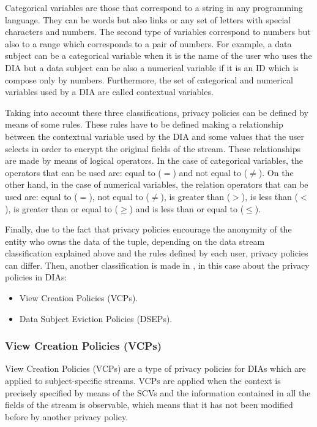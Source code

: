 Categorical variables are those that correspond to a string in any programming language. They can be words but also links or any set of letters with special characters and numbers. The second type of variables correspond to numbers but also to a range which corresponds to a pair of numbers. For example, a data subject can be a categorical variable when it is the name of the user who uses the DIA but a data subject can be also a numerical variable if it is an ID which is compose only by numbers. Furthermore, the set of categorical and numerical variables used by a DIA are called contextual variables.

Taking into account these three classifications, privacy policies can be defined by means of some rules. These rules have to be defined making a relationship between the contextual variable used by the DIA and some values that the user selects in order to encrypt the original fields of the stream. These relationships are made by means of logical operators. In the case of categorical variables, the operators that can be used are: equal to ($=$) and not equal to ($\neq$). On the other hand, in the case of numerical variables, the relation operators that can be used are: equal to ($=$), not equal to ($\neq$), is greater than ($>$), is less than ($<$), is greater than or equal to ($\geq$) and is less than or equal to ($\leq$).

Finally, due to the fact that privacy policies encourage the anonymity of the entity who owns the data of the tuple, depending on the data stream classification explained above and the rules defined by each user, privacy policies can differ. Then, another classification is made in \cite{privacypoliciesarticle}, in this case about the privacy policies in DIAs:

\begin{itemize}

\item View Creation Policies (VCPs).
\item Data Subject Eviction Policies (DSEPs).

\end{itemize}

\subsubsection{View Creation Policies (VCPs)}

View Creation Policies (VCPs) are a type of privacy policies for DIAs which are applied to subject-specific streams. VCPs are applied when the context is precisely specified by means of the SCVs and the information contained in all the fields of the stream is observable, which means that it has not been modified before by another privacy policy.

